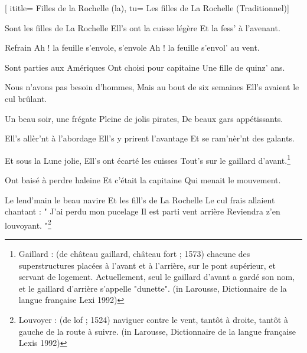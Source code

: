  [
ititle= {Filles de la Rochelle (la)},
tu= {Les filles de La Rochelle (Traditionnel)}]

\beginverse
Sont les filles de La Rochelle
Ell's ont la cuisse légère
Et la fess' à l'avenant.
\endverse

\beginchorus
Refrain
Ah ! la feuille s'envole, s'envole
Ah ! la feuille s'envol' au vent.
\endchorus

\beginverse
Sont parties aux Amériques
Ont choisi pour capitaine
Une fille de quinz' ans.
\endverse

\beginverse
Nous n'avons pas besoin d'hommes,
Mais au bout de six semaines
Ell's avaient le cul brûlant.
\endverse

\beginverse
Un beau soir, une frégate
Pleine de jolis pirates,
De beaux gars appétissants.
\endverse

\beginverse
Ell's allèr'nt à l'abordage
Ell's y prirent l'avantage
Et se ram'nèr'nt des galants.
\endverse

\beginverse
Et sous la Lune jolie,
Ell's ont écarté les cuisses
Tout's sur le gaillard d'avant.\footnote {Gaillard : (de château gaillard, château fort ; 1573) chacune des superstructures placées à l'avant et à l'arrière, sur le pont supérieur, et servant de logement. Actuellement, seul le gaillard d'avant a gardé son nom, et le gaillard d'arrière s'appelle "dunette". (in Larousse, Dictionnaire de la langue française Lexi 1992)}
\endverse

\beginverse
Ont baisé à perdre haleine
Et c'était la capitaine
Qui menait le mouvement.
\endverse

\beginverse
Le lend'main le beau navire
Et les fill's de La Rochelle
Le cul frais allaient chantant :
" J'ai perdu mon pucelage
Il est parti vent arrière
Reviendra z'en louvoyant. "\footnote {Louvoyer : (de lof ; 1524) naviguer contre le vent, tantôt à droite, tantôt à gauche de la route à suivre. (in Larousse, Dictionnaire de la langue française Lexis 1992)}
\endverse

\endsong